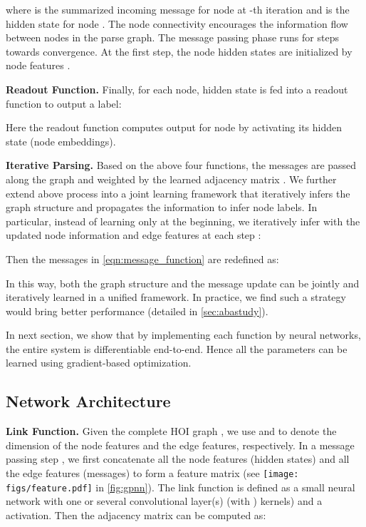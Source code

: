 \documentclass[runningheads]{llncs}
\begin{document}
where  is the summarized incoming message for node  at -th iteration and  is the hidden state for node . The node connectivity  encourages the information flow between nodes in the parse graph. The message passing phase runs for  steps towards convergence. At the first step, the node hidden states  are initialized by node features .

\noindent\textbf{Readout Function.} Finally, for each node, hidden state is fed into a readout function to output a label:

Here the readout function  computes output  for node  by activating its hidden state  (node embeddings).

\noindent\textbf{Iterative Parsing.} Based on the above four functions, the messages are passed along the graph and weighted by the learned adjacency matrix . We further extend above process into a joint learning framework that iteratively infers the graph structure and propagates the information to infer node labels. In particular, instead of learning  only at the beginning, we iteratively infer  with the updated node information and edge features at each step :

Then the messages in \autoref{eqn:message_function} are redefined as:

In this way, both the graph structure and the message update can be jointly and iteratively learned in a unified framework. In practice, we find such a strategy would bring better performance (detailed in \autoref{sec:abastudy}).

In next section, we show that by implementing each function by neural networks, the entire system is differentiable end-to-end. Hence all the parameters can be learned using gradient-based optimization.

\subsection{Network Architecture}
\label{sec:net_ar}


\noindent\textbf{Link Function.} Given the complete HOI graph , we use  and  to denote the dimension of the node features and the edge features, respectively. In a message passing step , we first concatenate all the node features (hidden states)  and all the edge features (messages)  to form a feature matrix  (see \texttt{[image: figs/feature.pdf]} in \autoref{fig:gpnn}). The link function is defined as a small neural network with one or several convolutional layer(s) (with ) kernels) and a  activation. Then the adjacency matrix  can be computed as:
\end{document}
